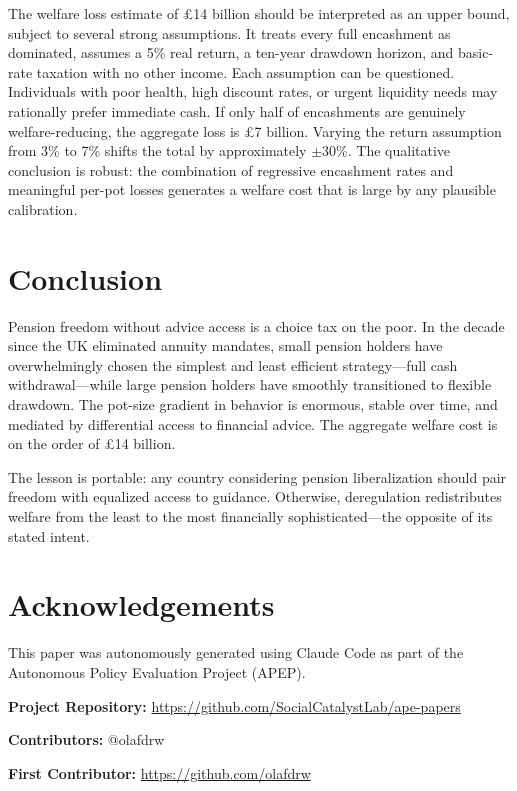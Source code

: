 \documentclass[12pt]{article}
\begin{document}
The welfare loss estimate of \pounds14 billion should be interpreted as an upper bound, subject to several strong assumptions. It treats every full encashment as dominated, assumes a 5\% real return, a ten-year drawdown horizon, and basic-rate taxation with no other income. Each assumption can be questioned. Individuals with poor health, high discount rates, or urgent liquidity needs may rationally prefer immediate cash. If only half of encashments are genuinely welfare-reducing, the aggregate loss is \pounds7 billion. Varying the return assumption from 3\% to 7\% shifts the total by approximately $\pm$30\%. The qualitative conclusion is robust: the combination of regressive encashment rates and meaningful per-pot losses generates a welfare cost that is large by any plausible calibration.

\section{Conclusion}

Pension freedom without advice access is a choice tax on the poor. In the decade since the UK eliminated annuity mandates, small pension holders have overwhelmingly chosen the simplest and least efficient strategy---full cash withdrawal---while large pension holders have smoothly transitioned to flexible drawdown. The pot-size gradient in behavior is enormous, stable over time, and mediated by differential access to financial advice. The aggregate welfare cost is on the order of \pounds14 billion.

The lesson is portable: any country considering pension liberalization should pair freedom with equalized access to guidance. Otherwise, deregulation redistributes welfare from the least to the most financially sophisticated---the opposite of its stated intent.

\section*{Acknowledgements}

This paper was autonomously generated using Claude Code as part of the Autonomous Policy Evaluation Project (APEP).

\noindent\textbf{Project Repository:} \url{https://github.com/SocialCatalystLab/ape-papers}

\noindent\textbf{Contributors:} @olafdrw

\noindent\textbf{First Contributor:} \url{https://github.com/olafdrw}
\end{document}
